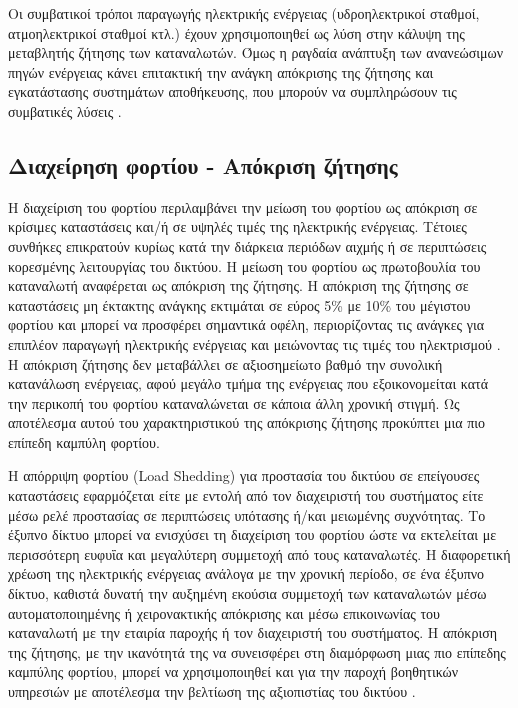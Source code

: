 \documentclass[12pt, a4paper, oneside]{report}
\begin{document}
Οι συμβατικοί τρόποι παραγωγής ηλεκτρικής ενέργειας (υδροηλεκτρικοί σταθμοί, ατμοηλεκτρικοί σταθμοί κτλ.) έχουν χρησιμοποιηθεί ως λύση στην κάλυψη της μεταβλητής ζήτησης των καταναλωτών. Όμως η ραγδαία ανάπτυξη των ανανεώσιμων πηγών ενέργειας κάνει επιτακτική την ανάγκη απόκρισης της ζήτησης και εγκατάστασης συστημάτων αποθήκευσης, που μπορούν να συμπληρώσουν τις συμβατικές λύσεις \cite{39}.

\subsection{Διαχείρηση φορτίου - Απόκριση ζήτησης}

Η διαχείριση του φορτίου περιλαμβάνει την μείωση του φορτίου ως απόκριση σε κρίσιμες καταστάσεις και\slash ή σε υψηλές τιμές της ηλεκτρικής ενέργειας. Τέτοιες συνθήκες επικρατούν κυρίως κατά την διάρκεια περιόδων αιχμής ή σε περιπτώσεις κορεσμένης λειτουργίας του δικτύου. Η μείωση του φορτίου ως πρωτοβουλία του καταναλωτή αναφέρεται ως απόκριση της ζήτησης. Η απόκριση της ζήτησης σε καταστάσεις μη έκτακτης ανάγκης εκτιμάται σε εύρος 5\% με 10\% του μέγιστου φορτίου και μπορεί να προσφέρει σημαντικά οφέλη, περιορίζοντας τις ανάγκες για επιπλέον παραγωγή ηλεκτρικής ενέργειας και μειώνοντας τις τιμές του ηλεκτρισμού \cite{45}. Η απόκριση ζήτησης δεν μεταβάλλει σε αξιοσημείωτο βαθμό την συνολική κατανάλωση ενέργειας, αφού μεγάλο τμήμα της ενέργειας που εξοικονομείται κατά την περικοπή του φορτίου καταναλώνεται σε κάποια άλλη χρονική στιγμή. Ως αποτέλεσμα αυτού του χαρακτηριστικού της απόκρισης ζήτησης προκύπτει μια πιο επίπεδη καμπύλη φορτίου.

Η απόρριψη φορτίου (Load Shedding) για προστασία του δικτύου σε επείγουσες καταστάσεις εφαρμόζεται είτε με εντολή από τον διαχειριστή του συστήματος είτε μέσω ρελέ προστασίας σε περιπτώσεις υπότασης ή\slash και μειωμένης συχνότητας. Το έξυπνο δίκτυο μπορεί να ενισχύσει τη διαχείριση του φορτίου ώστε να εκτελείται με περισσότερη ευφυΐα και μεγαλύτερη συμμετοχή από τους καταναλωτές. Η διαφορετική χρέωση της ηλεκτρικής ενέργειας ανάλογα με την χρονική περίοδο, σε ένα έξυπνο δίκτυο, καθιστά δυνατή την αυξημένη εκούσια συμμετοχή των καταναλωτών μέσω αυτοματοποιημένης ή χειρονακτικής απόκρισης και μέσω επικοινωνίας του καταναλωτή με την εταιρία παροχής ή τον διαχειριστή του συστήματος. Η απόκριση της ζήτησης, με την ικανότητά της να συνεισφέρει στη διαμόρφωση μιας πιο επίπεδης καμπύλης φορτίου, μπορεί να χρησιμοποιηθεί και για την παροχή βοηθητικών υπηρεσιών με αποτέλεσμα την βελτίωση της αξιοπιστίας του δικτύου \cite{39}.
\end{document}
